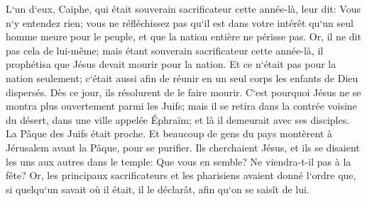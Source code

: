 \verse L`un d`eux, Caïphe, qui était souverain sacrificateur cette année-là, leur dit: Vous n`y entendez rien; 
\verse vous ne réfléchissez pas qu`il est dans votre intérêt qu`un seul homme meure pour le peuple, et que la nation entière ne périsse pas. 
\verse Or, il ne dit pas cela de lui-même; mais étant souverain sacrificateur cette année-là, il prophétisa que Jésus devait mourir pour la nation. 
\verse Et ce n`était pas pour la nation seulement; c`était aussi afin de réunir en un seul corps les enfants de Dieu dispersés. 
\verse Dès ce jour, ils résolurent de le faire mourir. 
\verse C`est pourquoi Jésus ne se montra plus ouvertement parmi les Juifs; mais il se retira dans la contrée voisine du désert, dans une ville appelée Éphraïm; et là il demeurait avec ses disciples. 
\verse La Pâque des Juifs était proche. Et beaucoup de gens du pays montèrent à Jérusalem avant la Pâque, pour se purifier. 
\verse Ils cherchaient Jésus, et ils se disaient les uns aux autres dans le temple: Que vous en semble? Ne viendra-t-il pas à la fête? 
\verse Or, les principaux sacrificateurs et les pharisiens avaient donné l`ordre que, si quelqu`un savait où il était, il le déclarât, afin qu`on se saisît de lui. 


